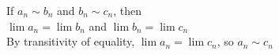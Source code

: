 \documentclass[preview]{standalone}
\begin{document}
\begin{center}
If $a_n \sim b_n$ and $b_n \sim c_n$, then\\$\lim a_n = \lim b_n$ and $\lim b_n = \lim c_n$\\By transitivity of equality, $\lim a_n = \lim c_n$, so $a_n \sim c_n$
\end{center}
\end{document}
